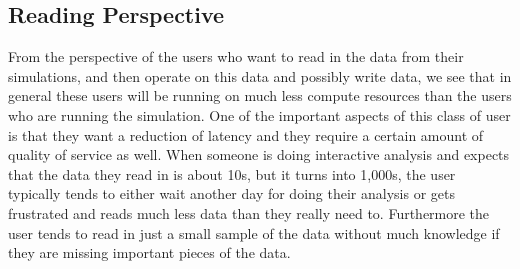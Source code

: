 \subsection{Reading  Perspective}
\label{subsec:reading-perspective}
From the perspective of the users who want to read in the data from their
simulations, and then operate on this data and possibly write data, we see
that in general these users will be running on much less compute resources
than the users who are running the simulation. One of the important aspects
of this class of user is that they want a reduction of latency and they
require a certain amount of quality of service as well. When someone is
doing interactive analysis and expects that the data they read in is about
10s, but it turns into 1,000s, the user typically tends to either wait
another day for doing their analysis or gets frustrated and reads much less
data than they really need to. Furthermore the user tends to read in just a
small sample of the data without much knowledge if they are missing
important pieces of the data.


